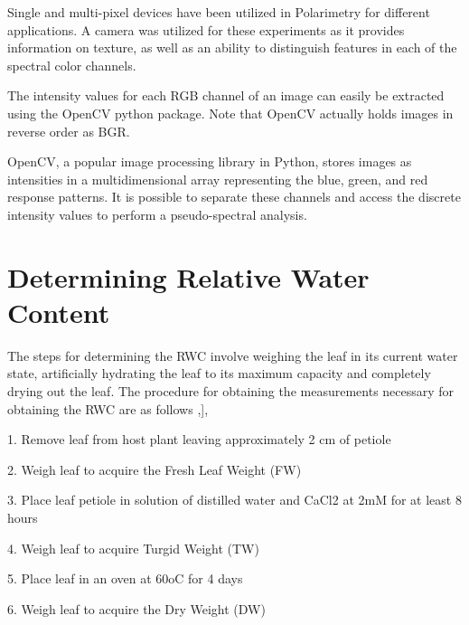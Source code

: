 Single and multi-pixel devices have been utilized in Polarimetry for different applications.  A camera was utilized for these experiments as it provides information on texture, as well as an ability to distinguish features in each of the spectral color channels.

The intensity values for each RGB channel of an image can easily be extracted using the OpenCV python package.  Note that OpenCV actually holds images in reverse order as BGR.

OpenCV, a popular image processing library in Python, stores images as intensities in a multidimensional array representing the blue, green, and red response patterns.  It is possible to separate these channels and access the discrete intensity values to perform a pseudo-spectral analysis.

\section{Determining Relative Water Content}
The steps for determining the RWC involve weighing the leaf in its current water state, artificially hydrating the leaf to its maximum capacity and completely drying out the leaf.  The procedure for obtaining the measurements necessary for obtaining the RWC are as follows \cite{ecophysiology},\cite{rwc:1}],

1.	Remove leaf from host plant leaving approximately 2 cm of petiole

2.	Weigh leaf to acquire the Fresh Leaf Weight (FW)

3.	Place leaf petiole in solution of distilled water and CaCl2 at 2mM for at least 8 hours

4.	Weigh leaf to acquire Turgid Weight (TW)

5.	Place leaf in an oven at 60oC for 4 days

6.	Weigh leaf to acquire the Dry Weight (DW)


